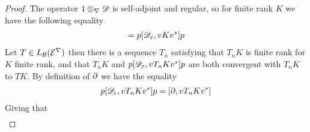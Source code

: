 \begin{proof}
	The operator $1\otimes_\nabla \mathscr{D}$ is self-adjoint and regular, so for finite rank $K$ we have the following equality
	\begin{align*}
		[1\tens_\nabla \D,vKv^*]=p[\D_\epsilon,vKv^*]p
	\end{align*}
	Let $T\in L_{\mathcal{B}}(\mathcal{E}^\nabla)$ then there is a sequence $T_n$ satisfying that $T_nK$ is finite rank for $K$ finite rank, and that $T_n K$ and $p[\mathscr{D}_\varepsilon,vT_nKv^*]p$ are both convergent with $T_nK$ to $TK$. By definition of $\partial$ we have the equality
	\begin{align*}
		p[\mathscr{D}_\varepsilon,vT_nKv^*]p=[\partial,vT_nKv^*]
	\end{align*}
	Giving that 
	\begin{align*}

\end{align*}
\end{proof}
